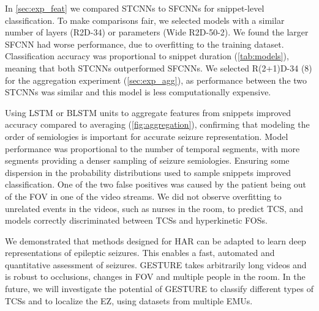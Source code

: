 In \cref{sec:exp_feat} we compared \acp{STCNN} to \acp{SFCNN} for snippet-level classification.
To make comparisons fair, we selected models with a similar number of layers (R2D-34) or parameters (Wide R2D-50-2).
We found the larger \ac{SFCNN} had worse performance, due to overfitting to the training dataset.
Classification accuracy was proportional to snippet duration (\cref{tab:models}), meaning that both \acp{STCNN} outperformed \acp{SFCNN}.
We selected R(2+1)D-34 (8) for the aggregation experiment (\cref{sec:exp_agg}), as performance between the two \acp{STCNN} was similar and this model is less computationally expensive.

Using \ac{LSTM} or \ac{BLSTM} units to aggregate features from snippets improved accuracy compared to averaging (\cref{fig:aggregation}), confirming that modeling the order of semiologies is important for accurate seizure representation.
Model performance was proportional to the number of temporal segments, with more segments providing a denser sampling of seizure semiologies. %
Ensuring some dispersion in the probability distributions used to sample snippets improved classification.
One of the two false positives was caused by the patient being out of the \ac{FOV} in one of the video streams.
We did not observe overfitting to unrelated events in the videos, such as nurses in the room, to predict \ac{TCS}, and models correctly discriminated between \acp{TCS} and hyperkinetic \acp{FOS}.

We demonstrated that methods designed for \ac{HAR} can be adapted to learn deep representations of epileptic seizures.
This enables a fast, automated and quantitative assessment of seizures.
\Ac{GESTURE} takes arbitrarily long videos and is robust to occlusions, changes in \ac{FOV} and multiple people in the room.
In the future, we will investigate the potential of \ac{GESTURE} to classify different types of \acp{TCS} and to localize the \ac{EZ}, using datasets from multiple \acp{EMU}.


